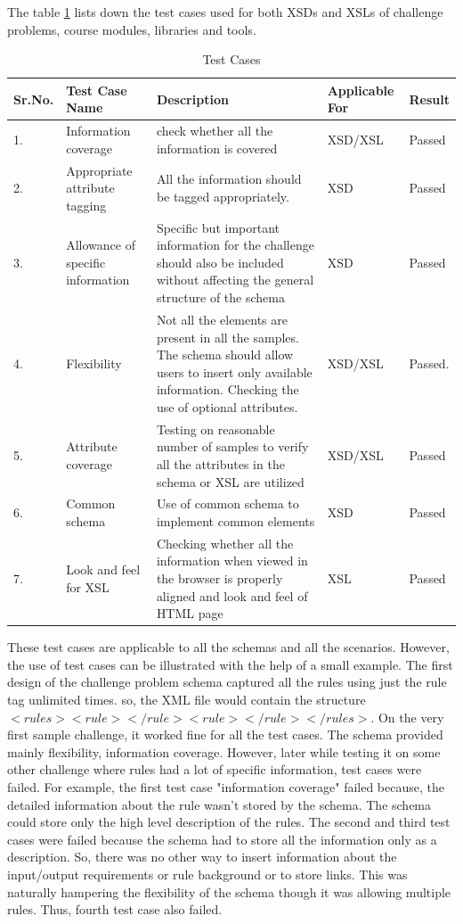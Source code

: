 \documentclass[11pt,letterpaper]{report}
\begin{document}
The table \ref{table:test} lists down the test cases used for both XSDs and XSLs of challenge problems, course modules, libraries and tools.
\begin{table}
\begin{tabular}{| l | p{2cm} | p{5cm} | p{2cm} | p{1cm} |}
\hline \textbf{Sr.No.} & \textbf{Test Case Name} & \textbf{Description} & \textbf{Applicable For} & \textbf{Result} \\ \hline 1. & Information coverage & check whether all the information is covered & XSD/XSL & Passed \\ 
\hline 2. & Appropriate attribute tagging & All the information should be tagged appropriately.  & XSD & Passed  \\  
\hline 3.& Allowance of specific information  & Specific but important information for the challenge should also be included without affecting the general structure of the schema & XSD & Passed \\ 
\hline 4.& Flexibility & Not all the elements are present in all the samples. The schema should allow users to insert only available information. Checking the use of optional attributes. & XSD/XSL & Passed. \\ 
\hline 5. & Attribute coverage & Testing on reasonable number of samples to verify all the attributes in the schema or XSL are utilized & XSD/XSL & Passed \\  
\hline 6. & Common schema & Use of common schema to implement common elements & XSD & Passed \\  
\hline 7. & Look and feel for XSL & Checking whether all the information when viewed in the browser is properly aligned and look and feel of HTML page & XSL & Passed \\ 
\hline
\end{tabular}
\caption[Table caption text]{Test Cases}
\label{table:test}
\end{table}
\pagebreak
These test cases are applicable to all the schemas and all the scenarios. However, the use of test cases can be illustrated with the help of a small example. The first design of the challenge problem schema captured all the rules using just the rule tag unlimited times. so, the XML file would contain the structure $<rules><rule></rule><rule></rule></rules>$. On the very first sample challenge, it worked fine for all the test cases. The schema provided mainly flexibility, information coverage. However, later while testing it on some other challenge where rules had a lot of specific information, test cases were failed. For example, the first test case "information coverage" failed because, the detailed information about the rule wasn't stored by the schema. The schema could store only the high level description of the rules. The second and third test cases were failed because the schema had to store all the information only as a description. So, there was no other way to insert information about the input/output requirements or rule background or to store links. This was naturally hampering the flexibility of the schema though it was allowing multiple rules. Thus, fourth test case also failed.
\end{document}
